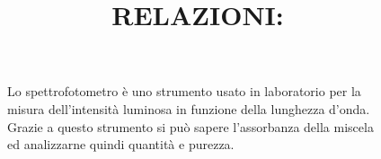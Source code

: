 \documentclass{article}
\begin{document}
\begin{enumerate}
\begin{figure}[H]
\begin{subfigure}[b]{1\textwidth}
				\end{subfigure}

			\caption{Lo spettrofotometro è uno strumento usato in laboratorio per la misura dell'intensità
			luminosa in funzione della lunghezza d'onda.
			Grazie a questo strumento si pu\`o sapere l'assorbanza della miscela ed analizzarne quindi quantità e purezza.}

		\end{figure}

		\vspace{0.5cm}

	\end{enumerate}

	\newpage

	\title{\huge{RELAZIONI:}}
	\maketitle
	\vspace{1.5cm}

	
	\newpage

	
	\newpage

	
	\newpage

	
	\newpage

	
	\newpage

	
	\newpage

	
	\newpage

	
	\newpage

	
	\newpage

	
	\newpage

	
	\newpage
\end{document}
